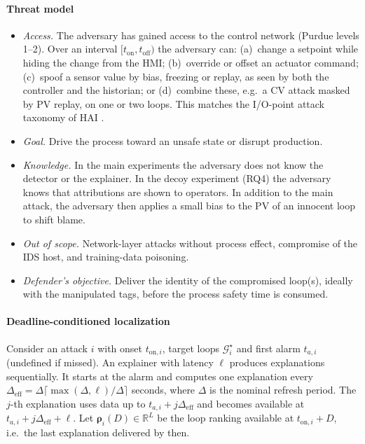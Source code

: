 \paragraph{Threat model}
\begin{itemize}
\item \emph{Access.} The adversary has gained access to the control network (Purdue levels 1--2). Over an interval $[t_{\mathrm{on}},t_{\mathrm{off}})$ the adversary can: (a)~change a setpoint while hiding the change from the HMI; (b)~override or offset an actuator command; (c)~spoof a sensor value by bias, freezing or replay, as seen by both the controller and the historian; or (d)~combine these, e.g.\ a CV attack masked by PV replay, on one or two loops. This matches the I/O-point attack taxonomy of HAI \citep{shin2021hai}.
\item \emph{Goal.} Drive the process toward an unsafe state or disrupt production.
\item \emph{Knowledge.} In the main experiments the adversary does not know the detector or the explainer. In the decoy experiment (RQ4) the adversary knows that attributions are shown to operators. In addition to the main attack, the adversary then applies a small bias to the PV of an innocent loop to shift blame.
\item \emph{Out of scope.} Network-layer attacks without process effect, compromise of the IDS host, and training-data poisoning.
\item \emph{Defender's objective.} Deliver the identity of the compromised loop(s), ideally with the manipulated tags, before the process safety time is consumed.
\end{itemize}

\paragraph{Deadline-conditioned localization}
Consider an attack $i$ with onset $t_{\mathrm{on},i}$, target loops $\mathcal G_i^\star$ and first alarm $t_{a,i}$ (undefined if missed). An explainer with latency $\ell$ produces explanations sequentially. It starts at the alarm and computes one explanation every $\Delta_{\mathrm{eff}}=\Delta\lceil\max(\Delta,\ell)/\Delta\rceil$ seconds, where $\Delta$ is the nominal refresh period. The $j$-th explanation uses data up to $t_{a,i}+j\Delta_{\mathrm{eff}}$ and becomes available at $t_{a,i}+j\Delta_{\mathrm{eff}}+\ell$. Let $\bm\rho_i(D)\in\mathbb R^L$ be the loop ranking available at $t_{\mathrm{on},i}+D$, i.e.\ the last explanation delivered by then.

